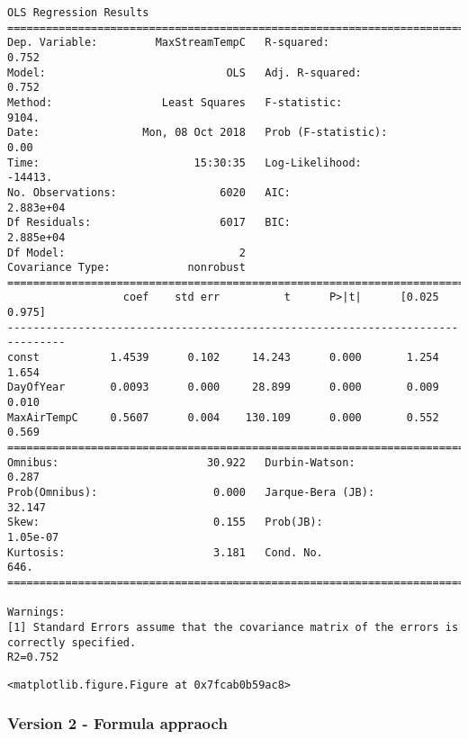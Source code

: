 \documentclass[11pt]{article}
\begin{document}
    \begin{Verbatim}[commandchars=\\\{\}]
                            OLS Regression Results                            
==============================================================================
Dep. Variable:         MaxStreamTempC   R-squared:                       0.752
Model:                            OLS   Adj. R-squared:                  0.752
Method:                 Least Squares   F-statistic:                     9104.
Date:                Mon, 08 Oct 2018   Prob (F-statistic):               0.00
Time:                        15:30:35   Log-Likelihood:                -14413.
No. Observations:                6020   AIC:                         2.883e+04
Df Residuals:                    6017   BIC:                         2.885e+04
Df Model:                           2                                         
Covariance Type:            nonrobust                                         
===============================================================================
                  coef    std err          t      P>|t|      [0.025      0.975]
-------------------------------------------------------------------------------
const           1.4539      0.102     14.243      0.000       1.254       1.654
DayOfYear       0.0093      0.000     28.899      0.000       0.009       0.010
MaxAirTempC     0.5607      0.004    130.109      0.000       0.552       0.569
==============================================================================
Omnibus:                       30.922   Durbin-Watson:                   0.287
Prob(Omnibus):                  0.000   Jarque-Bera (JB):               32.147
Skew:                           0.155   Prob(JB):                     1.05e-07
Kurtosis:                       3.181   Cond. No.                         646.
==============================================================================

Warnings:
[1] Standard Errors assume that the covariance matrix of the errors is correctly specified.
R2=0.752

    \end{Verbatim}

    
    \begin{verbatim}
<matplotlib.figure.Figure at 0x7fcab0b59ac8>
    \end{verbatim}

    
    \subsubsection{Version 2 - Formula
appraoch}\label{version-2---formula-appraoch}
\end{document}
